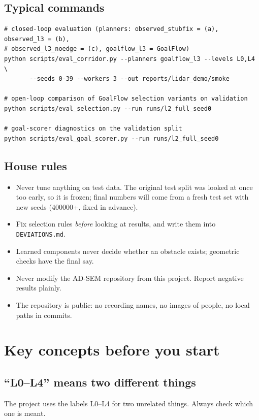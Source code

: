 \documentclass[11pt,a4paper]{article}
\newcommand{\code}[1]{\texttt{#1}}
\begin{document}
\subsection{Typical commands}
\begin{verbatim}
# closed-loop evaluation (planners: observed_stubfix = (a), observed_l3 = (b),
# observed_l3_noedge = (c), goalflow_l3 = GoalFlow)
python scripts/eval_corridor.py --planners goalflow_l3 --levels L0,L4 \
       --seeds 0-39 --workers 3 --out reports/lidar_demo/smoke

# open-loop comparison of GoalFlow selection variants on validation
python scripts/eval_selection.py --run runs/l2_full_seed0

# goal-scorer diagnostics on the validation split
python scripts/eval_goal_scorer.py --run runs/l2_full_seed0
\end{verbatim}

\subsection{House rules}
\begin{itemize}[nosep]
  \item Never tune anything on test data. The original test split was looked at once too early, so it
        is frozen; final numbers will come from a fresh test set with new seeds (400000+, fixed in advance).
  \item Fix selection rules \emph{before} looking at results, and write them into \code{DEVIATIONS.md}.
  \item Learned components never decide whether an obstacle exists; geometric checks have the final say.
  \item Never modify the AD-SEM repository from this project. Report negative results plainly.
  \item The repository is public: no recording names, no images of people, no local paths in commits.
\end{itemize}

\section{Key concepts before you start}
\label{sec:concepts}

\subsection{``L0--L4'' means two different things}
The project uses the labels L0--L4 for two unrelated things. Always check which one is meant.
\end{document}
